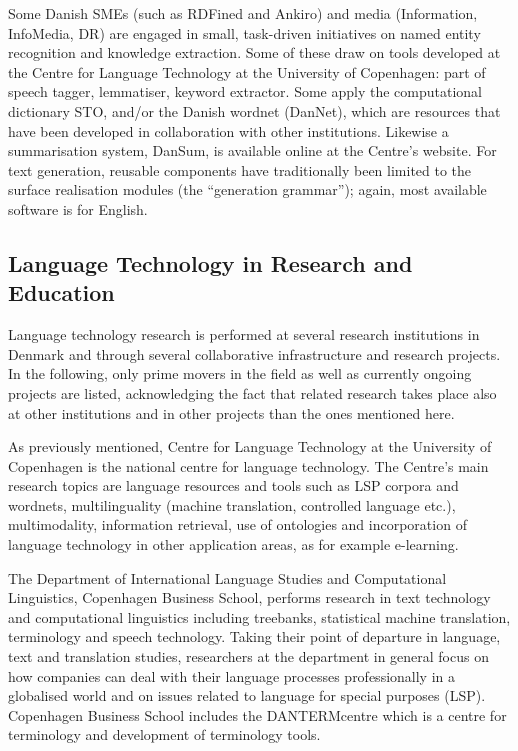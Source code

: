 \begin{multicols}{2}
Some Danish SMEs (such as RDFined and Ankiro) and media (Information, InfoMedia, DR) 
are engaged in small, task-driven initiatives on named entity recognition and knowledge extraction.  Some of these draw on tools developed at the Centre for Language Technology at the University of Copenhagen: part of speech tagger, lemmatiser, keyword extractor.  Some apply the computational dictionary STO, and/or the Danish wordnet (DanNet), which are resources that have been developed in collaboration with other institutions. Likewise a summarisation system, DanSum, is available online at the Centre's website.  For text generation, reusable components have traditionally been limited to the surface realisation modules (the “generation grammar”); again, most available software is for English. 


\subsection{Language Technology in Research and Education}

  Language technology research is performed at several research institutions in Denmark and through several collaborative infrastructure and research projects. In the following, only prime movers in the field as well as currently ongoing projects are listed, acknowledging the fact that related research takes place also at other institutions and in other projects than the ones mentioned here.

As previously mentioned, Centre for Language Technology at the University of Copenhagen is the national centre for language technology.  The Centre's main research topics are language resources and tools such as LSP corpora and wordnets, multilinguality (machine translation, controlled language etc.), multimodality, information retrieval, use of ontologies and incorporation of language technology in other application areas, as for example e-learning.

The Department of International Language Studies and Computational Linguistics, Copenhagen Business School, performs research in text technology and computational linguistics including tree\-banks, statistical machine translation, terminology and speech technology. Taking their point of departure in language, text and translation studies, researchers at the department  in general focus on how companies can deal with their language processes professionally in a globalised world and on issues related to language for special purposes (LSP). Copenhagen Business School includes the DANTERMcentre which is a centre for terminology and development of terminology tools.


\end{multicols}
